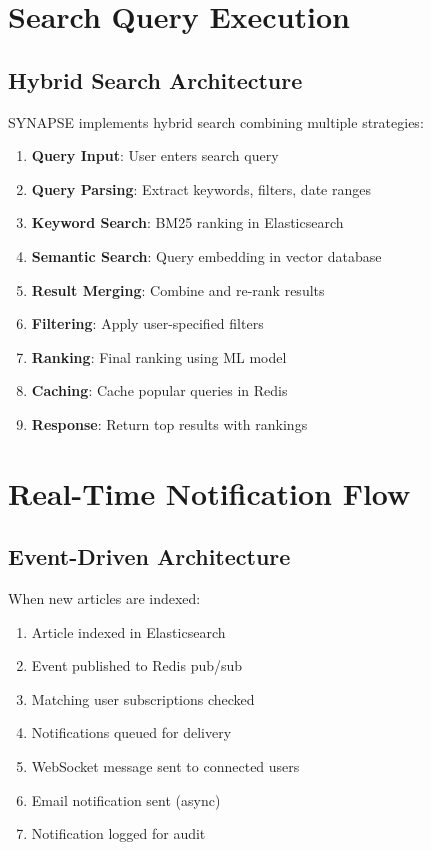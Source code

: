 \documentclass[12pt,a4paper]{report}
\begin{document}
\section{Search Query Execution}

\subsection{Hybrid Search Architecture}

SYNAPSE implements hybrid search combining multiple strategies:

\begin{enumerate}
    \item \textbf{Query Input}: User enters search query
    \item \textbf{Query Parsing}: Extract keywords, filters, date ranges
    \item \textbf{Keyword Search}: BM25 ranking in Elasticsearch
    \item \textbf{Semantic Search}: Query embedding in vector database
    \item \textbf{Result Merging}: Combine and re-rank results
    \item \textbf{Filtering}: Apply user-specified filters
    \item \textbf{Ranking}: Final ranking using ML model
    \item \textbf{Caching}: Cache popular queries in Redis
    \item \textbf{Response}: Return top results with rankings
\end{enumerate}

\section{Real-Time Notification Flow}

\subsection{Event-Driven Architecture}

When new articles are indexed:

\begin{enumerate}
    \item Article indexed in Elasticsearch
    \item Event published to Redis pub/sub
    \item Matching user subscriptions checked
    \item Notifications queued for delivery
    \item WebSocket message sent to connected users
    \item Email notification sent (async)
    \item Notification logged for audit
\end{enumerate}
\end{document}
